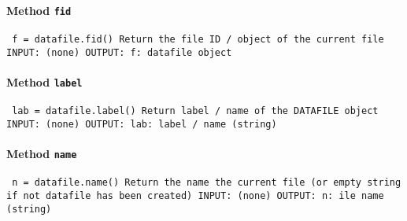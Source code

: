 \paragraph{Method \texttt{fid}}
\vspace{1ex}
\texttt{\newline
f = datafile.fid()\newline
\newline
Return the file ID / object of the current file\newline
\newline
INPUT:\newline
(none)\newline
\newline
OUTPUT:\newline
f: datafile object\newline
\newline
}

\paragraph{Method \texttt{label}}
\vspace{1ex}
\texttt{\newline
lab = datafile.label()\newline
\newline
Return label / name of the DATAFILE object\newline
\newline
INPUT:\newline
(none)\newline
\newline
OUTPUT:\newline
lab: label / name (string)\newline
\newline
}

\paragraph{Method \texttt{name}}
\vspace{1ex}
\texttt{\newline
n = datafile.name()\newline
\newline
Return the name the current file (or empty string if not datafile has been created)\newline
\newline
INPUT:\newline
(none)\newline
\newline
OUTPUT:\newline
n: ile name (string)\newline
\newline
}

